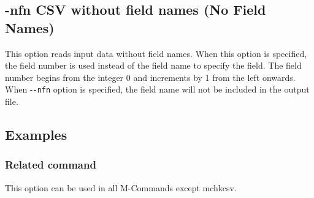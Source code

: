 %

\subsection{-nfn CSV without field names (No Field Names)\label{sect:option_nfn}}

This option reads input data without field names. When this option is specified, the field number is used instead of the field name to specify the field. The field number begins from the integer 0 and increments by 1 from the left onwards. When -\verb|-nfn| option is specified, the field name will not be included in the output file. 

\subsection*{Examples}


\subsubsection*{Related command}
This option can be used in all M-Commands except mchkcsv.

%


